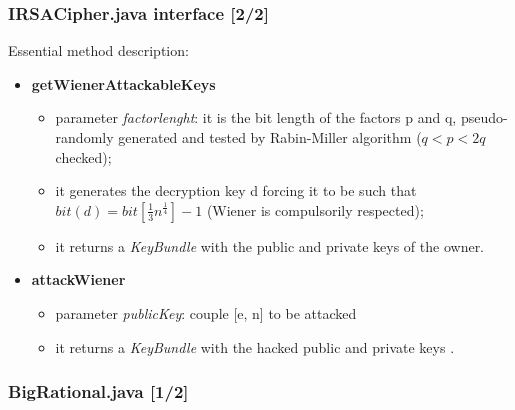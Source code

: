 \documentclass{beamer}
\begin{document}
  \begin{frame}
  \frametitle{IRSACipher.java interface [2/2]}
  
  Essential method description:
    
    \begin{itemize}
    	\item \textbf{getWienerAttackableKeys}
    	\begin{itemize}
    		\item parameter \textit{factorlenght}: it is the bit length of the factors p and q, pseudo-randomly generated and tested by Rabin-Miller algorithm ($q < p < 2q$ checked);
    		\item it generates the decryption key d forcing it to be such that $bit(d) = bit[\frac{1}{3}{n}^{\frac{1}{4}}] - 1$ (Wiener is compulsorily respected);
    		\item it returns a \textit{KeyBundle} with the public and private keys of the owner.
    	\end{itemize}
    	
    	\item \textbf{attackWiener}
    	\begin{itemize}
    		\item parameter \textit{publicKey}: couple [e, n] to be attacked
    		\item it returns a \textit{KeyBundle} with the hacked public and private keys .
    	\end{itemize}
    \end{itemize}
    
  \end{frame}
  
  \begin{frame}
  \frametitle{BigRational.java [1/2]}
    
    \lstset{basicstyle=\tiny}
    
    
  \end{frame}
  
\end{document}
